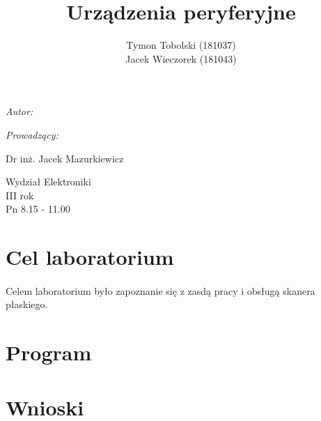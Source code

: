 \documentclass[wide,a4paper,titlepage,12pt] {article}
\title{Urządzenia peryferyjne}
\author{Tymon Tobolski (181037)\\ Jacek Wieczorek (181043)}
\makeatletter
\renewcommand{\maketitle}{
\begin{titlepage}
  \begin{center}
    \vspace*{3cm}
    \LARGE \@title \par
    \vspace{2cm}
    \textit{\small Autor:}\par
    \normalsize \@author\par \normalsize
    \vspace{3cm}
    \textit{\small Prowadzący:}\par
    Dr inż. Jacek Mazurkiewicz \par
    \vspace{2cm}
    Wydział Elektroniki\\ III rok\\ Pn 8.15 - 11.00\par
    \vspace{4cm}
    \small \@date
  \end{center}
\end{titlepage}
}
\makeatother
\begin{document}
\maketitle

\section{Cel laboratorium}
\paragraph{}
Celem laboratorium było zapoznanie się z zasdą pracy i obsługą skanera płaskiego.

\section{Program}


%     


\section{Wnioski}
\paragraph{}
\end{document}
